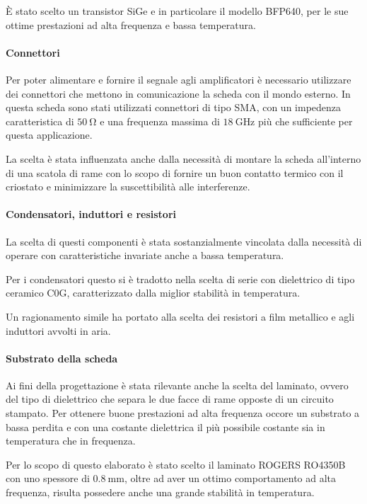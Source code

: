 \documentclass[12pt,oneside]{book}
\begin{document}
È stato scelto un transistor SiGe e in particolare il modello BFP640, per le sue ottime prestazioni ad alta frequenza e bassa temperatura.

\paragraph{Connettori} Per poter alimentare e fornire il segnale agli amplificatori è necessario utilizzare dei connettori che mettono in comunicazione la scheda con il mondo esterno. In questa scheda sono stati utilizzati connettori di tipo SMA, con un impedenza caratteristica di $\SI{50}{\ohm}$ e una frequenza massima di $\SI{18}{\giga\hertz}$ più che sufficiente per questa applicazione.

La scelta è stata influenzata anche dalla necessità di montare la scheda all'interno di una scatola di rame con lo scopo di fornire un buon contatto termico con il criostato e minimizzare la suscettibilità alle interferenze.

\paragraph{Condensatori, induttori e resistori} La scelta di questi componenti è stata sostanzialmente vincolata dalla necessità di operare con caratteristiche invariate anche a bassa temperatura.

Per i condensatori questo si è tradotto nella scelta di serie con dielettrico di  tipo ceramico C0G, caratterizzato dalla miglior stabilità in temperatura.

Un ragionamento simile ha portato alla scelta dei resistori a film metallico e agli induttori avvolti in aria.

\paragraph{Substrato della scheda} Ai fini della progettazione è stata rilevante anche la scelta del laminato, ovvero del tipo di dielettrico che separa le due facce di rame opposte di un circuito stampato. Per ottenere buone prestazioni ad alta frequenza occore un substrato a bassa perdita e con una costante dielettrica il più possibile costante sia in temperatura che in frequenza.

Per lo scopo di questo elaborato è stato scelto il laminato ROGERS RO4350B con uno spessore di $\SI{0.8}{\milli\meter}$, oltre ad aver un ottimo comportamento ad alta frequenza, risulta possedere anche una grande stabilità in temperatura.
\end{document}

